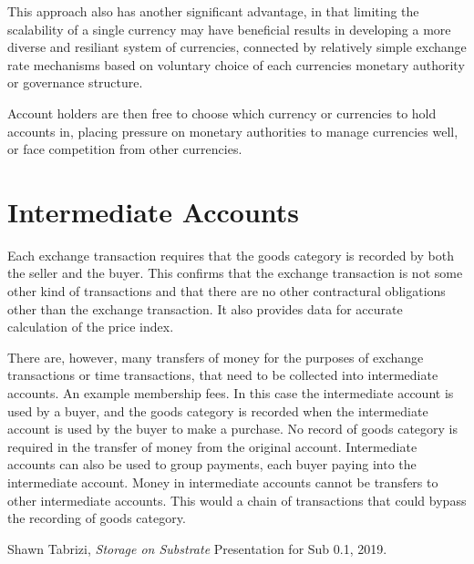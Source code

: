 \documentclass[a4paper]{book}
\begin{document}
This approach also has another significant advantage, in that limiting the scalability of a single
currency may have beneficial results in developing a more diverse and resiliant system of
currencies, connected by relatively simple exchange rate mechanisms based on voluntary choice of
each currencies monetary authority or governance structure.

Account holders are then free to choose which currency or currencies to hold accounts in, placing
pressure on monetary authorities to manage currencies well, or face competition from other
currencies.

\section{Intermediate Accounts}

Each exchange transaction requires that the goods category is recorded by both the seller and the
buyer. This confirms that the exchange transaction is not some other kind of transactions and that
there are no other contractural obligations other than the exchange transaction. It also provides
data for accurate calculation of the price index. 

There are, however, many transfers of money for the purposes of exchange transactions or time
transactions, that need to be collected into intermediate accounts. An example membership fees. In
this case the intermediate account is used by a buyer, and the goods category is recorded when the
intermediate account is used by the buyer to make a purchase. No record of goods category is
required in the transfer of money from the original account. Intermediate accounts can also be used
to group payments, each buyer paying into the intermediate account. Money in intermediate accounts
cannot be transfers to other intermediate accounts. This would a chain of transactions that could
bypass the recording of goods category. 

\begin{thebibliography}{9}

    Shawn Tabrizi,
    \emph{Storage on Substrate}
    Presentation for Sub 0.1,
    2019.

\end{thebibliography}
\end{document}
